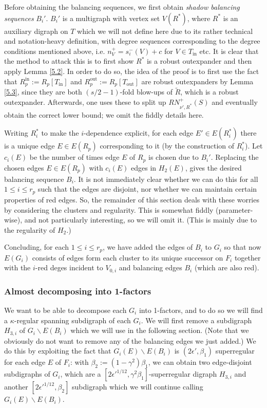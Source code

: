 \documentclass[10pt,letterpaper, reqno]{amsart}
\theoremstyle{definition}
\numberwithin{equation}{section}
\begin{document}
Before obtaining the balancing sequences, we first obtain \textit{shadow balancing sequences} $B_i'$. $B_i'$ is a multigraph with vertex set $V(R^*)$, where $R^*$ is an auxiliary digraph on $T$ which we will not define here due to its rather technical and notation-heavy definition, with degree sequences corresponding to the degree conditions mentioned above, i.e. $n_V^+ = s_i^-(V)+c$ for $V \in T_\text{in}$ etc. It is clear that the method to attack this is to first show $R^*$ is a robust outexpander and then apply Lemma \ref{5.2}. In order to do so, the idea of the proof is to first use the fact that $R_p^\text{in} := R_p[T_\text{in}]$ and $R_p^\text{out} := R_p[T_\text{out}]$ are robust outexpanders by Lemma \ref{5.3}, since they are both $(s/2-1)$-fold blow-ups of $\tilde{R}$, which is a robust outexpander. Afterwards, one uses these to split up $RN^+_{\nu',R^*}(S)$ and eventually obtain the correct lower bound; we omit the fiddly details here. 

Writing $R_i^*$ to make the $i$-dependence explicit, for each edge $E' \in E(R^*_i)$ there is a unique edge $E \in E(R_p)$ corresponding to it (by the construction of $R_i^*$). Let $c_i(E)$ be the number of times edge $E$ of $R_p$ is chosen due to $B_i'$. Replacing the chosen edges $E \in E(R_p)$ with $c_i(E)$ edges in $H_2(E)$, gives the desired balancing sequence $B_i$. It is not immediately clear whether we can do this for all $1\leq i\leq r_p$ such that the edges are disjoint, nor whether we can maintain certain properties of red edges. So, the remainder of this section deals with these worries by considering the clusters and regularity. This is somewhat fiddly (parameter-wise), and not particularly interesting, so we will omit it. (This is mainly due to the regularity of $H_2$.)

Concluding, for each $1\leq i \leq r_p$, we have added the edges of $B_i$ to $G_i$ so that now $E(G_i)$ consists of edges form each cluster to its unique successor on $F_i$ together with the $i$-red deges incident to $V_{0,i}$ and balancing edges $B_i$ (which are also red).

\subsubsection{Almost decomposing into 1-factors}
We want to be able to decompose each $G_i$ into 1-factors, and to do so we will find a $\kappa$-regular spanning subdigraph of each $G_i$. We will first remove a subdigraph $H_{3,i}$ of $G_i\backslash E(B_i) $ which we will use in the following section. (Note that we obviously do not want to remove any of the balancing edges we just added.) We do this by exploiting the fact that $G_i(E)\backslash E(B_i)$ is $(2\epsilon', \beta_1)$ superregular for each edge $E$ of $F_i$: with $\beta_2 := (1-\gamma^2)\beta_1$, we can obtain two edge-disjoint subdigraphs of $G_i$, which are a $[2\epsilon'^{1/12},\gamma^2\beta_1]$-superregular digraph $H_{3,i}$ and another $[2\epsilon'^{1/12},\beta_2]$ subdigraph which we will continue calling $G_i(E)\backslash E(B_i)$. 
\end{document}
